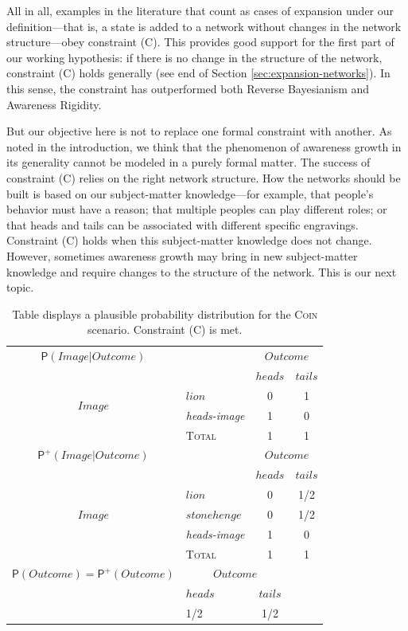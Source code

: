 \documentclass[
  11pt,
  dvipsnames,enabledeprecatedfontcommands]{scrartcl}
\newcommand{\pr}[1]{\ensuremath{\mathsf{P}(#1)}}
\newcommand{\ppr}[2]{\ensuremath{\mathsf{P}^{#1}(#2)}}
\begin{document}
All in all, examples in the literature that count as cases of expansion
under our definition---that is, a state is added to a network without
changes in the network structure---obey constraint (C). This provides
good support for the first part of our working hypothesis: if there is
no change in the structure of the network, constraint (C) holds
generally (see end of Section \ref{sec:expansion-networks}). In this
sense, the constraint has outperformed both Reverse Bayesianism and
Awareness Rigidity.

But our objective here is not to replace one formal constraint with
another. As noted in the introduction, we think that the phenomenon of
awareness growth in its generality cannot be modeled in a purely formal
matter. The success of constraint (C) relies on the right network
structure. How the networks should be built is based on our
subject-matter knowledge---for example, that people's behavior must have
a reason; that multiple peoples can play different roles; or that heads
and tails can be associated with different specific engravings.
Constraint (C) holds when this subject-matter knowledge does not change.
However, sometimes awareness growth may bring in new subject-matter
knowledge and require changes to the structure of the network. This is
our next topic.

\begin{table}
\begin{tabular}{clcc}
$\pr{Image \vert Outcome}$ & & \multicolumn{2}{c}{$Outcome$} \\
 &   & $heads$ & $tails$ \\
\multirow{2}{*}{$Image$} & $lion$ & 0 & 1\\
& \textit{heads-image} & 1 & 0 \\
\hline
& \textsc{Total} & 1 & 1 \\
\hline
\hline
$\ppr{+}{Image \vert Outcome}$ & & \multicolumn{2}{c}{$Outcome$} \\
&  & $heads$ & $tails$ \\
\multirow{3}{*}{$Image$} & $lion$ & 0 & 1/2\\ 
& $stonehenge$ & 0 & 1/2 \\
& \textit{heads-image} & 1 & 0 \\
\hline
& \textsc{Total} & 1 & 1 \\
\hline
\hline
$\pr{Outcome}=\ppr{+}{Outcome}$ & \multicolumn{2}{c}{$Outcome$} & \\
&  $heads$ & $tails$ & \\
& 1/2 & 1/2 & \\
\end{tabular}
\caption{Table displays a plausible probability distribution for the \textsc{Coin} scenario. Constraint (C) is met.}
\label{table:coin}
\end{table}
\end{document}
